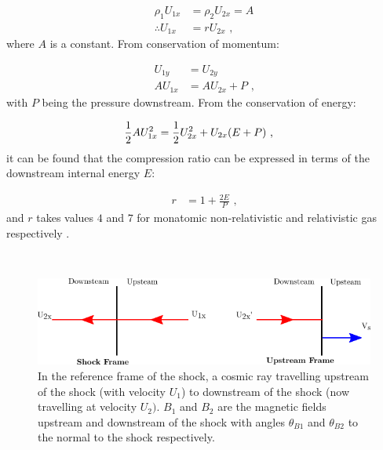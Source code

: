 \begin{equation}
    \begin{aligned}
        \rho_1U_{1x}&=\rho_2U_{2x}=A \\
        \therefore U_{1x}&=rU_{2x}\text{ ,}
    \end{aligned} \label{eq:A3_velocity_ratios}
\end{equation}
\noindent where $A$ is a constant. From conservation of momentum:

\begin{subequations}
    \begin{alignat}{1}
        U_{1y}&=U_{2y} \\
        AU_{1x}&=AU_{2x}+P\text{ ,}
    \end{alignat}
\end{subequations}
\noindent with $P$ being the pressure downstream. From the conservation of energy:

\begin{equation}
    \begin{aligned}
        \frac{1}{2}AU_{1x}^2&=\frac{1}{2}U_{2x}^2+U_{2x}\qty(E+P)\text{ ,}
    \end{aligned}
\end{equation}
\noindent it can be found that the compression ratio can be expressed in terms of the downstream internal energy $E$:

\begin{equation}
    \begin{aligned}
        r&=1+\frac{2E}{P}\text{ ,}
    \end{aligned}
\end{equation}
\noindent and $r$ takes values $4$ and $7$ for monatomic non-relativistic and relativistic gas respectively  \citep{1983RPPh...46..973D}.
\par~\par 
\begin{figure}[h]
	\centering
	\includegraphics[width=1.0\textwidth]{A3_Diffusive_Shock_Acceleration/Images/upstream_downstream.png}
	\caption{In the reference frame of the shock, a cosmic ray travelling upstream of the shock (with velocity $U_1$) to downstream of the shock (now travelling at velocity $U_2)$. $B_1$ and $B_2$ are the magnetic fields upstream and downstream of the shock with angles $\theta_{B1}$ and $\theta_{B2}$ to the normal to the shock respectively.}
	\label{fig:A3_shock_dynamics2}
\end{figure}

